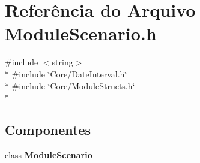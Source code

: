 \section{Referência do Arquivo Module\+Scenario.\+h}
\label{_module_scenario_8h}
{\ttfamily \#include $<$string$>$}\\*
{\ttfamily \#include \char`\"{}Core/\+Date\+Interval.\+h\char`\"{}}\\*
{\ttfamily \#include \char`\"{}Core/\+Module\+Structs.\+h\char`\"{}}\\*
\subsection*{Componentes}
\begin{DoxyCompactItemize}
\item 
class {\bf Module\+Scenario}
\end{DoxyCompactItemize}
